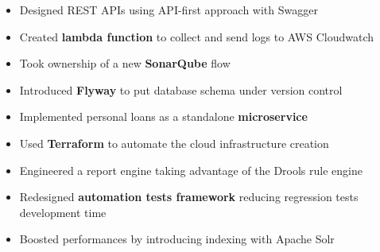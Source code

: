 \documentclass[10pt,a4paper,ragged2e]{altacv}
\begin{document}

\begin{fullwidth}
\makecvheader
\end{fullwidth}



\begin{itemize}
\item Designed REST APIs using API-first approach with Swagger
\item Created \textbf{lambda function} to collect and send logs to AWS Cloudwatch
\item Took ownership of a new \textbf{SonarQube} flow
\end{itemize}

\divider

\begin{itemize}
\item Introduced \textbf{Flyway} to put database schema under version control
\item Implemented personal loans as a standalone \textbf{microservice}
\item Used \textbf{Terraform} to automate the cloud infrastructure creation
\end{itemize}
\divider

\begin{itemize}
\item Engineered a report engine taking advantage of the Drools rule engine
\item Redesigned \textbf{automation tests framework} reducing regression tests development time
\item Boosted performances by introducing indexing with Apache Solr
\end{itemize}
\end{document}

